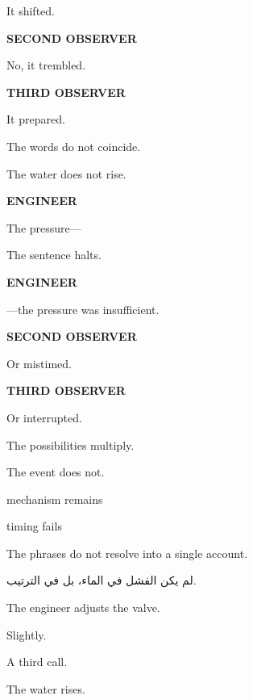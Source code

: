 It shifted.

\medskip

\textbf{SECOND OBSERVER}

No, it trembled.

\medskip

\textbf{THIRD OBSERVER}

It prepared.

\medskip

The words do not coincide.

\medskip

The water does not rise.

\medskip

\textbf{ENGINEER}

The pressure---

\medskip

The sentence halts.

\medskip

\textbf{ENGINEER}

---the pressure was insufficient.

\medskip

\textbf{SECOND OBSERVER}

Or mistimed.

\medskip

\textbf{THIRD OBSERVER}

Or interrupted.

\medskip

The possibilities multiply.

The event does not.

\medskip

 mechanism remains

 timing fails

\medskip

The phrases do not resolve into a single account.

\medskip

\begin{AR}
لم يكن الفشل في الماء، بل في الترتيب.
\end{AR}

\medskip

The engineer adjusts the valve.

Slightly.

\medskip

A third call.

\medskip

The water rises.

\medskip

